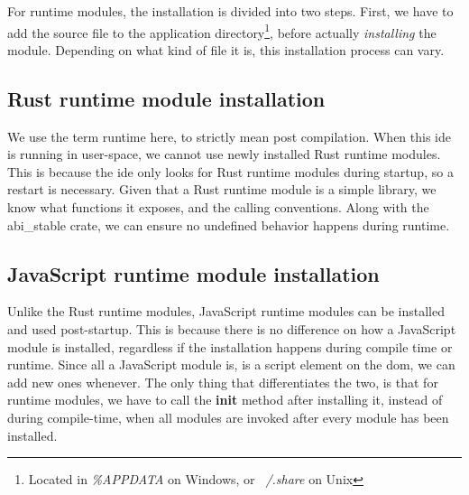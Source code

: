 For runtime modules, the installation is divided into two steps. First, we have
to add the source file to the application directory\footnote{Located in \textit{\%APPDATA} on Windows, or \textit{~/.share} on Unix},
before actually \textit{installing} the module. Depending on what kind of file
it is, this installation process can vary.


\subsection{Rust runtime module installation}

We use the term runtime here, to strictly mean post compilation. When this
\gls*{ide} is running in user-space, we cannot use newly installed Rust
runtime modules. This is because the \gls*{ide} only looks for Rust runtime
modules during startup, so a restart is necessary. Given that a Rust runtime
module is a simple library, we know what functions it exposes, and the calling
conventions. Along with the abi\_stable crate, we can ensure no undefined
behavior happens during runtime.


\subsection{JavaScript runtime module installation}

Unlike the Rust runtime modules, JavaScript runtime modules can be installed and
used post-startup. This is because there is no difference on how a JavaScript
module is installed, regardless if the installation happens during compile time
or runtime. Since all a JavaScript module is, is a script element on the
\gls*{dom}, we can add new ones whenever. The only thing that differentiates the
two, is that for runtime modules, we have to call the \textbf{init} method after
installing it, instead of during compile-time, when all modules are invoked
after every module has been installed.

